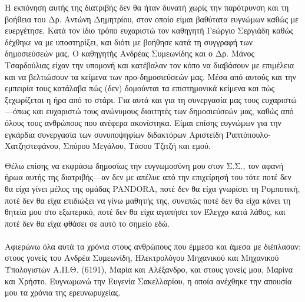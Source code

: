 
Η εκπόνηση αυτής της διατριβής δεν θα ήταν δυνατή χωρίς την παρότρυνση και τη
βοήθεια του Δρ. Αντώνη Δημητρίου, στον οποίο είμαι βαθύτατα ευγνώμων καθώς με
ευεργέτησε. Κατά τον ίδιο τρόπο ευχαριστώ τον καθηγητή Γεώργιο Σεργιάδη καθώς
δέχθηκε να με υποστηρίξει, και διότι με βοήθησε κατά τη συγγραφή των
δημοσιεύσεών μας. Ο καθηγητής Ανδρέας Συμεωνίδης και ο Δρ. Μάνος Τσαρδούλιας
είχαν την υπομονή και κατέβαλαν τον κόπο να διαβάσουν με επιμέλεια και να
βελτιώσουν τα κείμενα των προ-δημοσιεύσεών μας. Μέσα από αυτούς και την
εμπειρία τους κατάλαβα πώς (δεν) δομούνται τα επιστημονικά κείμενα και πώς
ξεχωρίζεται η ήρα από το στάρι. Για αυτά και για τη συνεργασία μας τους
ευχαριστώ---όπως και ευχαριστώ τους ανώνυμους διαιτητές των δημοσιεύσεών μας,
καθώς από όλους τους ανθρώπους που ανέφερα ακονίστηκα. Είμαι επίσης ευγνώμων
για την εγκάρδια συνεργασία των συνυποψηφίων διδακτόρων Αριστείδη
Ραπτόπουλο-Χατζηστεφάνου, Σπύρου Μεγάλου, Τάσου Τζιτζή και εμού.

Θέλω επίσης να εκφράσω δημοσίως την ευγνωμοσύνη μου στον Σ.Σ., τον αφανή ήρωα
αυτής της διατριβής---αν δεν με απέλυε από την επιχείρησή του τότε ποτέ δεν θα
είχα γίνει μέλος της ομάδας PANDORA, ποτέ δεν θα είχα γνωρίσει τη Ρομποτική,
ποτέ δεν θα είχα επιδιώξει να γίνω μαθητής της, συνεπώς ποτέ δεν θα είχα κάνει
τη θητεία μου στο εξωτερικό, ποτέ δεν θα είχα αγαπήσει τον Έλεγχο κατά
λάθος, και ποτέ δεν θα είχα φθάσει σε αυτό το σημείο εδώ.  \\ \\

Αφιερώνω όλα αυτά τα χρόνια στους ανθρώπους που έμμεσα και άμεσα με διέπλασαν:
στους γονείς του Ανδρέα Συμεωνίδη, Ηλεκτρολόγου Μηχανικού και Μηχανικού
Υπολογιστών Α.Π.Θ. (6191), Μαρία και Αλέξανδρο, και στους γονείς μου, Μαρίνα και
Χρήστο. Ευγνωμωνώ την Ευγενία Σακελλαρίου, η οποία ανέχθηκε την απουσία μου τα
χρόνια της ερευνωρυχείας.

\afterpage{\blankpage}
\restoregeometry
\cleardoublepage
